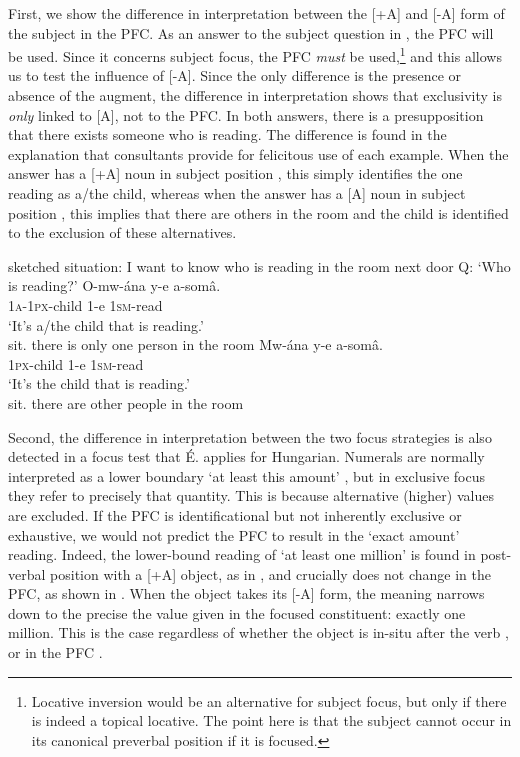 \documentclass[output=paper]{langsci/langscibook}
\begin{document}
  First, we show the difference in interpretation between the [+A] and [-A] form of the subject in the PFC. As an answer to the subject question in , the PFC will be used. Since it concerns subject focus, the PFC \textit{must} be used,\footnote{Locative inversion would be an alternative for subject focus, but only if there is indeed a topical locative. The point here is that the subject cannot occur in its canonical preverbal position if it is focused.} and this allows us to test the influence of [-A]. Since the only difference is the presence or absence of the augment, the difference in interpretation shows that exclusivity is \textit{only} linked to [A], not to the PFC. In both answers, there is a presupposition that there exists someone who is reading. The difference is found in the explanation that consultants provide for felicitous use of each example. When the answer has a [+A] noun in subject position , this simply identifies the one reading as a/the child, whereas when the answer has a [A] noun in subject position , this implies that there are others in the room and the child is identified to the exclusion of these alternatives.

\ea\label{ex:vanderwal:39}
{sketched situation: I want to know who is reading in the room next door}
\glt   Q: ‘Who is reading?’
\ea\label{ex:vanderwal:39a}
\gll    O-mw-ána  y-e  a-somâ.\\
         \textsc{1a}-\textsc{1px}-child  1-e  \textsc{1sm}-read\\
\glt     ‘It’s a/the child that is reading.’\\
sit. there is only one person in the room
\ex\label{ex:vanderwal:39b}
\gll    Mw-ána  y-e  a-somâ.\\
         \textsc{1px}-child  1-e  \textsc{1sm}-read\\
\glt   ‘It’s the child that is reading.’\\
sit. there are other people in the room
\z
\z

Second, the difference in interpretation between the two focus strategies is also detected in a focus test that É. \citet{Kiss2009} applies for Hungarian. Numerals are normally interpreted as a lower boundary ‘at least this amount’ \citep{Horn1972,Levinson2000}, but in exclusive focus they refer to precisely that quantity. This is because alternative (higher) values are excluded. If the PFC is identificational but not inherently exclusive or exhaustive, we would not predict the PFC to result in the ‘exact amount’ reading. Indeed, the lower-bound reading of ‘at least one million’ is found in post-verbal position with a [+A] object, as in , and crucially does not change in the PFC, as shown in . When the object takes its [-A] form, the meaning narrows down to the precise the value given in the focused constituent: exactly one million. This is the case regardless of whether the object is in-situ after the verb , or in the PFC .
\end{document}
